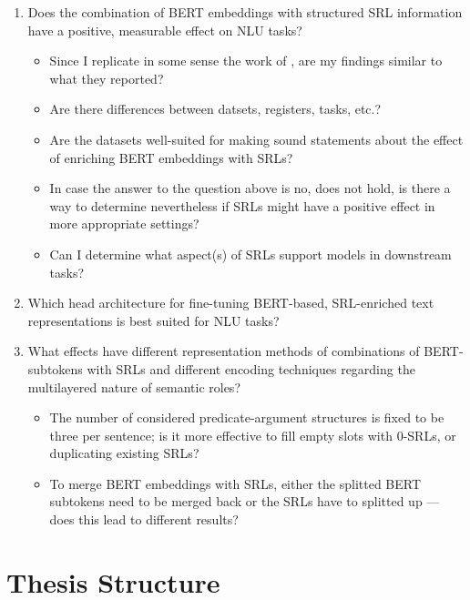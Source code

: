 \begin{enumerate}
  \item \label{ques:one} Does the combination of  BERT embeddings with structured SRL information have a positive,
                         measurable effect on NLU tasks?
    \begin{itemize}
      \item Since I replicate in some sense the work of \cite{zhang2019semantics}, are my findings similar to what they reported?
      \item Are there differences between datsets, registers, tasks, etc.?
      \item Are the datasets well-suited for making sound statements about the effect of enriching BERT embeddings with SRLs?
      \item In case the answer to the question above is no, does not hold, is there a way to determine nevertheless if SRLs might have a positive effect in more appropriate settings?
      \item Can I determine what aspect(s) of SRLs support models in downstream tasks?
    \end{itemize}
  \item \label{ques:two} Which head architecture for fine-tuning BERT-based, SRL-enriched text representations is best suited for
                          NLU tasks?
  \item \label{ques:three} What effects have different representation methods of combinations of BERT-subtokens with SRLs and different encoding techniques regarding the multilayered nature of semantic roles?
    \begin{itemize}
      \item The number of considered predicate-argument
            structures is fixed to be three per sentence; is it more effective to fill empty slots with
            0-SRLs, or duplicating existing SRLs?
      \item To merge BERT embeddings with SRLs, either
            the splitted BERT subtokens need to be merged back or the SRLs have to splitted up --- does
            this lead to different results?
    \end{itemize}

\end{enumerate}



\section{Thesis Structure}

